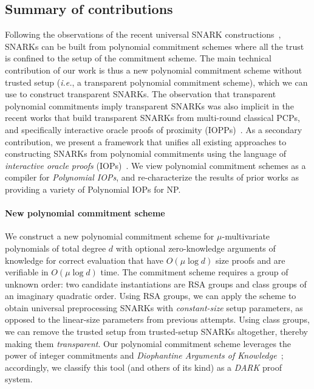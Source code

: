 
\subsection{Summary of contributions} 
Following the observations of the recent universal SNARK constructions~\cite{Plonk,Sonic,Libra}, SNARKs can be built from polynomial commitment schemes where all the trust is confined to the setup of the commitment scheme. The main technical contribution of our work is thus a new polynomial commitment scheme without trusted setup (\emph{i.e.}, a transparent polynomial commitment scheme), which we can use to construct transparent SNARKs. The observation that transparent polynomial commitments imply transparent SNARKs was also implicit in the recent works that build transparent SNARKs from multi-round classical PCPs, and specifically interactive oracle proofs of proximity (IOPPs)~\cite{ICALP:BBHR18}. As a secondary contribution, we present a framework that unifies all existing approaches to constructing SNARKs from polynomial commitments using the language of \emph{interactive oracle proofs} (IOPs)~\cite{STOC:ReiRotRot16,TCC:BenChiSpo16}. We view polynomial commitment schemes as a compiler for \emph{Polynomial IOPs}, and re-characterize the results of prior works as providing a variety of Polynomial IOPs for NP. 

\paragraph{New polynomial commitment scheme} We construct a new polynomial commitment scheme for $\mu$-multivariate polynomials of total degree $d$ with optional zero-knowledge arguments of knowledge for correct evaluation that have $O(\mu \log d)$ size proofs and are verifiable in $O(\mu \log d)$ time. The commitment scheme requires a group of unknown order: two candidate instantiations are RSA groups and class groups of an imaginary quadratic order. Using RSA groups, we can apply the scheme to obtain universal preprocessing SNARKs with \emph{constant-size}  %
setup parameters, as opposed to the linear-size parameters from previous attempts. Using class groups, we can remove the trusted setup from trusted-setup SNARKs altogether, thereby making them \emph{transparent}. Our polynomial commitment scheme leverages the power of integer commitments and \emph{Diophantine Arguments of Knowledge}~\cite{AC:Lipmaa03a}; accordingly, we classify this tool (and others of its kind) as a \emph{DARK} proof system.

